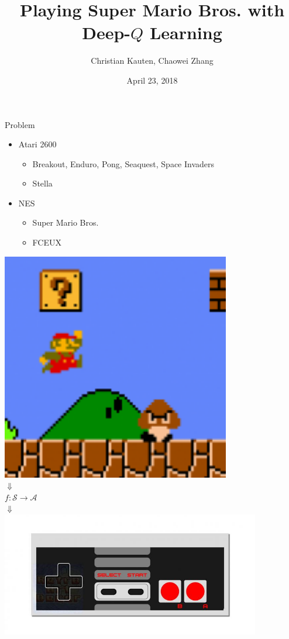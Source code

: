 \documentclass{beamer}
\title{Playing Super Mario Bros. with Deep-$Q$ Learning}
\author{Christian Kauten, Chaowei Zhang}
\institute{Auburn University}
\date{April 23, 2018}
\begin{document}
\frame{\titlepage}



\begin{frame}{Problem}
\begin{minipage}{\textwidth}
%
\begin{minipage}{0.5\textwidth}
\begin{itemize}
    \item{Atari 2600}
        \begin{itemize}
        \item{Breakout, Enduro, Pong, Seaquest, Space Invaders}
        \item{Stella}
        \end{itemize}
    \item{NES}
        \begin{itemize}
        \item{Super Mario Bros.}
        \item{FCEUX}
        \end{itemize}
\end{itemize}
\end{minipage}
%
\hfill
%
\begin{minipage}[t]{0.5\textwidth}
\centering
\includegraphics[width=0.75\textwidth]{img/smb} \\
$\Downarrow$ \\
$f : \mathcal{S} \to \mathcal{A}$ \\
$\Downarrow$ \\
\includegraphics[width=0.85\textwidth]{img/nes}
\end{minipage}
%
\end{minipage}
\end{frame}
\end{document}
